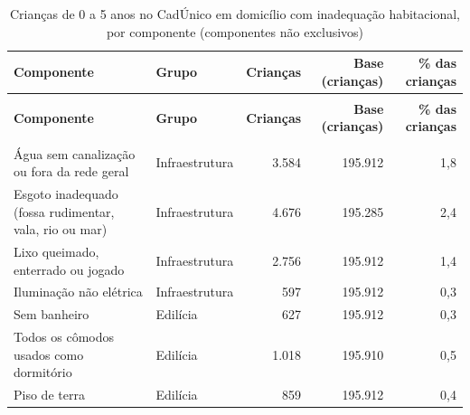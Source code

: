 \begin{apendicesenv}
{\small\setlength{\tabcolsep}{5pt}
\begin{longtable}{@{}>{\raggedright\arraybackslash}p{3.6cm}lrrr@{}}
\caption{Crianças de 0 a 5 anos no CadÚnico em domicílio com inadequação habitacional, por componente (componentes não exclusivos)}\label{tab:cadunico-inadequacao-componentes-0-a-5-2026}\\
\toprule \textbf{Componente} & \textbf{Grupo} & \textbf{Crianças} & \parbox[b]{2.20cm}{\raggedleft{} \textbf{Base (crianças)}} & \parbox[b]{2.20cm}{\raggedleft{} \textbf{\% das crianças}} \\ \midrule \endfirsthead
{}\\ \toprule \textbf{Componente} & \textbf{Grupo} & \textbf{Crianças} & \parbox[b]{2.20cm}{\raggedleft{} \textbf{Base (crianças)}} & \parbox[b]{2.20cm}{\raggedleft{} \textbf{\% das crianças}} \\ \midrule \endhead
\midrule {}\\ \endfoot
\bottomrule \endlastfoot
Água sem canalização ou fora da rede geral & Infraestrutura & 3.584 & 195.912 & 1,8 \\
Esgoto inadequado (fossa rudimentar, vala, rio ou mar) & Infraestrutura & 4.676 & 195.285 & 2,4 \\
Lixo queimado, enterrado ou jogado & Infraestrutura & 2.756 & 195.912 & 1,4 \\
Iluminação não elétrica & Infraestrutura & 597 & 195.912 & 0,3 \\
Sem banheiro & Edilícia & 627 & 195.912 & 0,3 \\
Todos os cômodos usados como dormitório & Edilícia & 1.018 & 195.910 & 0,5 \\
Piso de terra & Edilícia & 859 & 195.912 & 0,4 \\
\end{longtable}}
\vspace{-6pt}



\end{apendicesenv}
